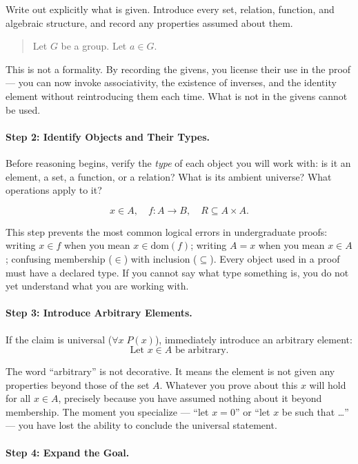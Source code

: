 Write out explicitly what is given. Introduce every set, relation,
function, and algebraic structure, and record any properties assumed
about them.

\begin{quote}
Let $G$ be a group. Let $a \in G$.
\end{quote}

This is not a formality. By recording the givens, you license their
use in the proof --- you can now invoke associativity, the existence of
inverses, and the identity element without reintroducing them each time.
What is not in the givens cannot be used.

\paragraph{Step 2: Identify Objects and Their Types.}

Before reasoning begins, verify the \emph{type} of each object you
will work with: is it an element, a set, a function, or a relation?
What is its ambient universe? What operations apply to it?

\[
x \in A,\quad f : A \to B,\quad R \subseteq A \times A.
\]

This step prevents the most common logical errors in undergraduate
proofs: writing $x \in f$ when you mean $x \in \text{dom}(f)$; writing
$A = x$ when you mean $x \in A$; confusing membership ($\in$) with
inclusion ($\subseteq$). Every object used in a proof must have a
declared type. If you cannot say what type something is, you do not
yet understand what you are working with.

\paragraph{Step 3: Introduce Arbitrary Elements.}

If the claim is universal ($\forall x\; P(x)$), immediately introduce
an arbitrary element:
\[
\text{Let } x \in A \text{ be arbitrary.}
\]

The word ``arbitrary'' is not decorative. It means the element is not
given any properties beyond those of the set $A$. Whatever you prove
about this $x$ will hold for all $x \in A$, precisely because you have
assumed nothing about it beyond membership. The moment you specialize
--- ``let $x = 0$'' or ``let $x$ be such that \ldots'' --- you have
lost the ability to conclude the universal statement.

\paragraph{Step 4: Expand the Goal.}

